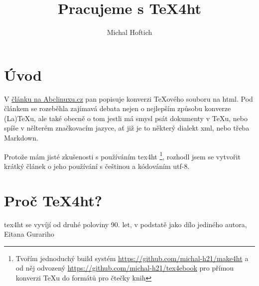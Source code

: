 \documentclass{article}
\begin{document}
\title{Pracujeme s TeX4ht}
\author{Michal Hoftich}
\maketitle
\tableofcontents
\section{Úvod}
V \href{http://www.abclinuxu.cz/clanky/tex-5-priklad-makra-pro-generovani-html}{článku na Abclinuxu.cz} 
pan \textcite{Olsak13}  popisuje konverzi \TeX ového souboru na html. 
Pod článkem se rozeběhla zajímavá debata nejen o nejlepším způsobu konverze
(La)\TeX u, ale také obecně o tom jestli má smysl psát dokumenty v \TeX u, nebo spíše v nělterém značkovacím jazyce, ať již je to některý dialekt xml, nebo třeba Markdown.

Protože mám jisté zkušenosti s používáním \gls{tex4ht}%
\footnote{Tvořím jednoduchý build systém \href{make4ht}{https://github.com/michal-h21/make4ht} 
a od něj odvozený \href{tex4ebook}{https://github.com/michal-h21/tex4ebook} 
pro přímou konverzi \TeX u do formátů pro čtečky knih},
rozhodl jsem se vytvořit krátký článek o jeho používání s češtinou a kódováním utf-8.

\section{Proč TeX4ht?}

\gls{tex4ht} se vyvíjí od druhé poloviny 90. let, v podstatě jako dílo 
jediného autora, Eitana Gurariho

\printglossary
\printbibliography
\end{document}
